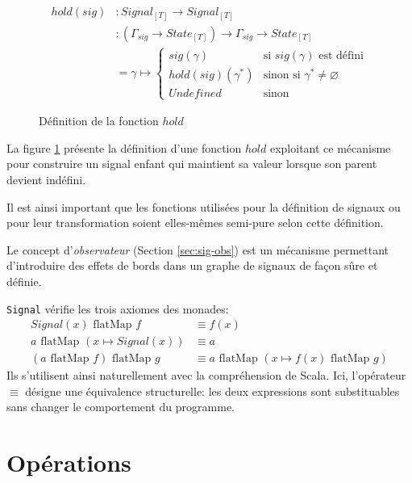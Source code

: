 	\begin{figure}
		\begin{align*}
			hold (sig) &\colon Signal_{[T]} \to Signal_{[T]} \\
			           &\colon (\Gamma_{sig} \to State_{[T]}) \to \Gamma_{sig} \to State_{[T]} \\
			           &= \gamma \mapsto \begin{cases}
			           		sig(\gamma) & \text{si } sig(\gamma) \text{ est défini} \\
			           		hold(sig)(\gamma^*) & \text{sinon si } \gamma^* \ne \varnothing \\
			           		Undefined & \text{sinon}
			           \end{cases}
		\end{align*}
		\caption{Définition de la fonction $hold$}
		\label{fig:sig-hold}
	\end{figure}

	La figure \ref{fig:sig-hold} présente la définition d'une fonction $hold$ exploitant ce mécanisme pour construire un signal enfant qui maintient sa valeur lorsque son parent devient indéfini.
	
	Il est ainsi important que les fonctions utilisées pour la définition de signaux ou pour leur transformation soient elles-mêmes semi-pure selon cette définition.
	
	Le concept d'\emph{observateur} (Section \ref{sec:sig-obs}) est un mécanisme permettant d'introduire des effets de bords dans un graphe de signaux de façon sûre et définie.
	
	\texttt{Signal} vérifie les trois axiomes des monades\cite{haskell-monad-laws}:
	\begin{align*}
		Signal(x) \text{ flatMap } f &\equiv f(x) \\
		a \text{ flatMap } (x \mapsto Signal(x)) &\equiv a \\
		(a \text{ flatMap } f)  \text{ flatMap } g &\equiv
			a \text{ flatMap } (x \mapsto f(x)  \text{ flatMap } g) 
	\end{align*}
	Ils s'utilisent ainsi naturellement avec la compréhension  de Scala. Ici, l'opérateur $\equiv$ désigne une équivalence structurelle: les deux expressions sont substituables sans changer le comportement du programme.

\section{Opérations}
	
